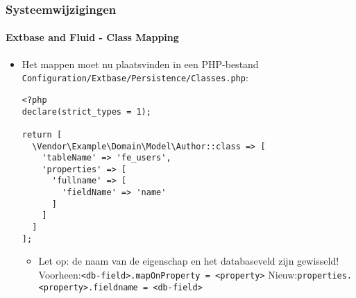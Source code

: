 
\begin{frame}[fragile]
	\frametitle{Systeemwijzigingen}
	\framesubtitle{Extbase and Fluid - Class Mapping}

	\lstset{basicstyle=\tiny\ttfamily}

	\begin{itemize}
		\item Het mappen moet nu plaatsvinden in een PHP-bestand \texttt{Configuration/Extbase/Persistence/Classes.php}:
\begin{lstlisting}
<?php
declare(strict_types = 1);

return [
  \Vendor\Example\Domain\Model\Author::class => [
    'tableName' => 'fe_users',
    'properties' => [
      'fullname' => [
        'fieldName' => 'name'
      ]
    ]
  ]
];
\end{lstlisting}

		\begin{itemize}\smaller
			\item[\ding{228}] Let op: de naam van de eigenschap en het databaseveld zijn gewisseld!\newline
				Voorheen:\tabto{1.6cm}\texttt{<db-field>.mapOnProperty = <property>}\newline
				Nieuw:\tabto{1.6cm}\texttt{properties.<property>.fieldname = <db-field>}
		\end{itemize}\normalsize

	\end{itemize}

\end{frame}


